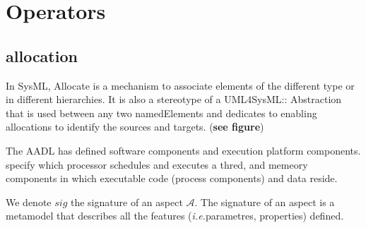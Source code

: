 \section{Operators}

\subsection{allocation}
In SysML, Allocate is a mechanism to associate elements of the different type or in different hierarchies. It is also a stereotype of a UML4SysML:: Abstraction that is used between any two namedElements and dedicates to enabling allocations to identify the sources and targets. (\textbf{see figure}) 

The AADL has defined software components and execution platform components. specify which processor schedules and executes a thred, and memeory components in which executable code (process components) and data reside.








We denote $sig$ the signature of an aspect $\mathcal{A}$. The signature of an aspect is a metamodel that describes all the features (\textit{i.e.}parametres, properties) defined.